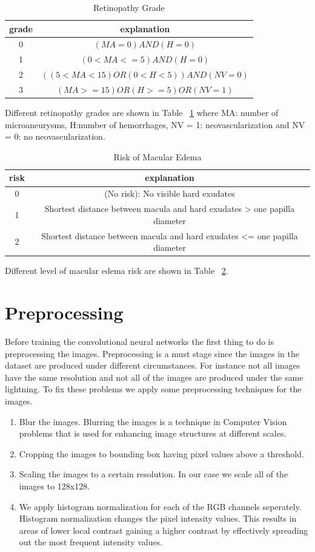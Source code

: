 \begin{table}[t]
\centering
\caption{Retinopathy Grade} \label{tab:rg}
\begin{tabular}{|c|c|} \hline
grade & explanation \\ \hline
0 & $(MA = 0) AND (H = 0)$ \\ \hline
1 & $(0 < MA <= 5) AND (H = 0)$\\\hline
2 & $((5 < MA < 15) OR (0 < H < 5)) AND (NV = 0)$ \\\hline
3 & $(MA >= 15) OR (H >=5) OR (NV = 1)$\\\hline
\end{tabular}
\end{table}

Different retinopathy grades are shown in Table ~\ref{tab:rg} where MA: number of microaneurysms, H:number of hemorrhages, NV = 1: neovascularization and NV = 0: no neovascularization. 

\begin{table}[t]
\centering
\caption{Risk of Macular Edema} \label{tab:ma}
\begin{tabular}{|c|c|} \hline
risk & explanation \\ \hline
0 & (No risk): No visible hard exudates \\ \hline
1 & Shortest distance between macula and hard exudates > one papilla diameter\\\hline
2 & Shortest distance between macula and hard exudates <= one papilla diameter \\\hline
\end{tabular}
\end{table}

Different level of macular edema risk are shown in Table ~\ref{tab:ma}.

\section{Preprocessing}
Before training the convolutional neural networks the first thing to do is preprocessing the images. Preprocessing is a must stage since the images in the dataset are produced under different circumstances. For instance not all images have the same resolution and not all of the images are produced under the same lightning. To fix these problems we apply some preprocessing techniques for the images. 

\begin{enumerate}
    \item Blur the images. Blurring the images is a technique in Computer Vision problems that is used for enhancing image structures at different scales.
    \item Cropping the images to bounding box having pixel values above a threshold.
    \item Scaling the images to a certain resolution. In our case we scale all of the images to 128x128.
    \item We apply histogram normalization for each of the RGB channels seperately. Histogram normalization changes the pixel intensity values. This results in areas of lower local contrast gaining a higher contrast by effectively spreading out the most frequent intensity values.
\end{enumerate}

